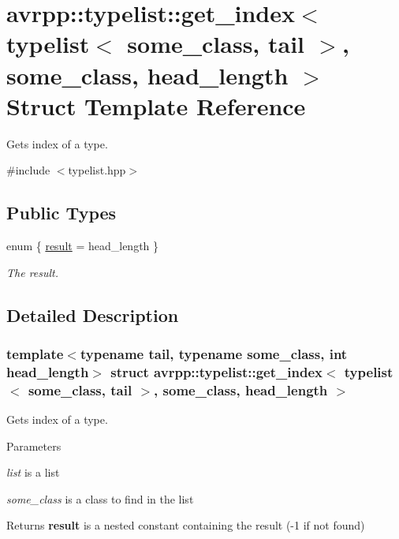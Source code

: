\hypertarget{structavrpp_1_1typelist_1_1get__index_3_01typelist_3_01some__class_00_01tail_01_4_00_01some__class_00_01head__length_01_4}{
\section{avrpp::typelist::get\_\-index$<$ typelist$<$ some\_\-class, tail $>$, some\_\-class, head\_\-length $>$ Struct Template Reference}
\label{structavrpp_1_1typelist_1_1get__index_3_01typelist_3_01some__class_00_01tail_01_4_00_01some__class_00_01head__length_01_4}
}


Gets index of a type.  




{\ttfamily \#include $<$typelist.hpp$>$}

\subsection*{Public Types}
\begin{DoxyCompactItemize}
\item 
enum \{ \hyperlink{structavrpp_1_1typelist_1_1get__index_3_01typelist_3_01some__class_00_01tail_01_4_00_01some__class_00_01head__length_01_4_a3593d44543a3d901b2cf0c4f53791abdaa57f92febc323cd63afb88b8b027c387}{result} =  head\_\-length
 \}
\begin{DoxyCompactList}\small\item\em The result. \item\end{DoxyCompactList}\end{DoxyCompactItemize}


\subsection{Detailed Description}
\subsubsection*{template$<$typename tail, typename some\_\-class, int head\_\-length$>$ struct avrpp::typelist::get\_\-index$<$ typelist$<$ some\_\-class, tail $>$, some\_\-class, head\_\-length $>$}

Gets index of a type. 
\begin{DoxyParams}{Parameters}
\item[{\em list}]is a list \item[{\em some\_\-class}]is a class to find in the list \end{DoxyParams}
\begin{DoxyReturn}{Returns}
{\bfseries result} is a nested constant containing the result (-\/1 if not found) 
\end{DoxyReturn}


